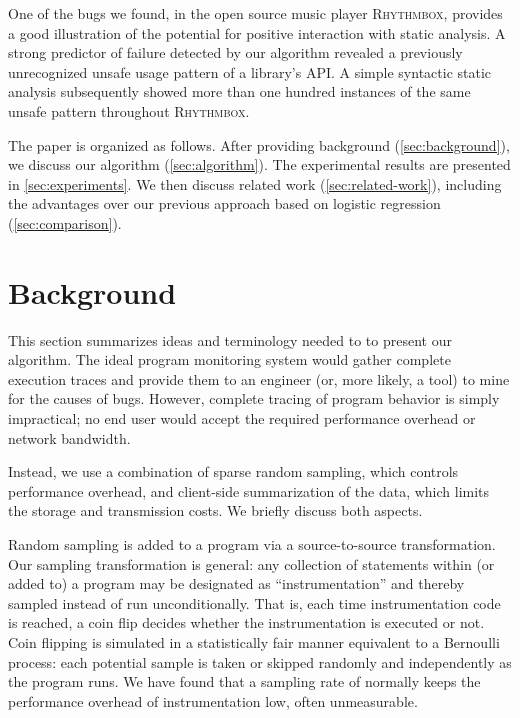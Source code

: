 \documentclass[draft]{sig-alternate}
\newcommand{\rhythmbox}{\textsc{Rhythmbox}\xspace}
\newcommand{\issue}[2][]{}
\begin{document}
One of the bugs we found, in the open source music player \rhythmbox,
provides a good illustration of the potential for positive interaction
with static analysis.  A strong predictor of failure detected by our
algorithm revealed a previously unrecognized unsafe usage pattern of a
library's API\@.  A simple syntactic static analysis subsequently showed
more than one hundred instances of the same unsafe pattern throughout
\rhythmbox.

The paper is organized as follows.  After providing background
(\autoref{sec:background}), we discuss our algorithm
(\autoref{sec:algorithm}). The experimental results are presented in
\autoref{sec:experiments}.  We then discuss related
work (\autoref{sec:related-work}), including the advantages over our
previous approach based on logistic regression
(\autoref{sec:comparison}).


\section{Background}
\label{sec:background}

This section summarizes ideas and terminology needed to to present our
algorithm.  The ideal program monitoring system would gather complete
execution traces and provide them to an engineer (or, more likely, a
tool) to mine for the causes of bugs.  However, complete tracing of
program behavior is simply impractical; no end user would accept the
required performance overhead or network bandwidth.

Instead, we use a combination of sparse random sampling, which controls
performance overhead, and client-side summarization of the data, which
limits the storage and transmission costs.  We briefly discuss
both aspects.

Random sampling is added to a program via a source-to-source transformation.
Our sampling transformation is general: any collection of
statements within (or added to) a program may be designated as
``instrumentation'' and thereby sampled instead of run
unconditionally.  That is, each time instrumentation code is reached,
a coin flip decides whether the instrumentation is executed or not.
Coin flipping is simulated in a statistically fair
manner equivalent to a Bernoulli process: each potential sample is
taken or skipped randomly and independently as the program runs.
We have found that a sampling rate of  normally keeps the performance overhead
of instrumentation low, often unmeasurable.
\issue[Alice]{Is this true?  I thought Ben's thesis would claim otherwise.}
\end{document}

